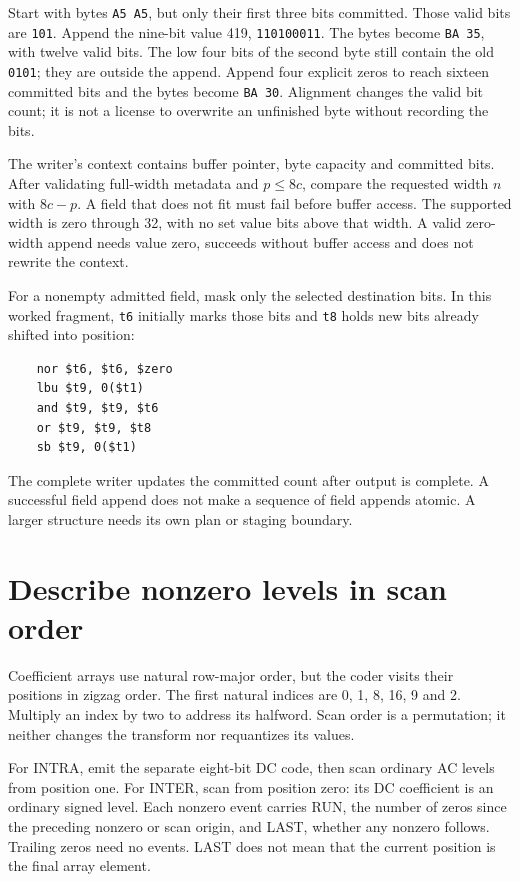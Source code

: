 Start with bytes \texttt{A5 A5}, but only their first three bits committed.
Those valid bits are \texttt{101}. Append the nine-bit value 419,
\texttt{110100011}. The bytes become \texttt{BA 35}, with twelve valid bits.
The low four bits of the second byte still contain the old \texttt{0101}; they
are outside the append. Append four explicit zeros to reach sixteen committed
bits and the bytes become \texttt{BA 30}. Alignment changes the valid bit count;
it is not a license to overwrite an unfinished byte without recording the bits.




The writer's context contains buffer pointer, byte capacity and committed bits.
After validating full-width metadata and $p\leq8c$, compare the requested width
$n$ with $8c-p$. A field that does not fit must fail before buffer access.
The supported width is zero through 32, with no set value bits above that width.
A valid zero-width append needs value zero, succeeds without buffer access and
does not rewrite the context.

For a nonempty admitted field, mask only the selected destination bits. In this
worked fragment, \texttt{t6} initially marks those bits and \texttt{t8} holds
new bits already shifted into position:
\begin{verbatim}
    nor $t6, $t6, $zero
    lbu $t9, 0($t1)
    and $t9, $t9, $t6
    or $t9, $t9, $t8
    sb $t9, 0($t1)
\end{verbatim}
The complete writer updates the committed count after output is complete.
A successful field append does not make a sequence of field appends atomic.
A larger structure needs its own plan or staging boundary.

\section{Describe nonzero levels in scan order}

Coefficient arrays use natural row-major order, but the coder visits their
positions in zigzag order. The first natural indices are 0, 1, 8, 16, 9 and 2.
Multiply an index by two to address its halfword. Scan order is a permutation;
it neither changes the transform nor requantizes its values.

For INTRA, emit the separate eight-bit DC code, then scan ordinary AC levels
from position one. For INTER, scan from position zero: its DC coefficient is
an ordinary signed level. Each nonzero event carries RUN, the number of zeros
since the preceding nonzero or scan origin, and LAST, whether any nonzero
follows. Trailing zeros need no events. LAST does not mean that the current
position is the final array element.

